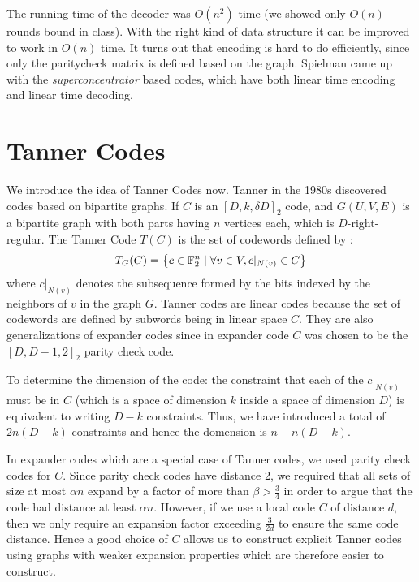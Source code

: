\begin{curiousity}
The running time of the decoder was $O(n^2)$ time (we showed only $O(n)$ rounds bound in class). With the right kind of data structure it can be improved to work in $O(n)$ time. It turns out that encoding is hard to do efficiently, since only the paritycheck matrix is defined based on the graph. Spielman came up with the
\textit{superconcentrator} based codes, which have both linear time encoding and linear time decoding.
\end{curiousity}

\section{Tanner Codes}

We introduce the idea of Tanner Codes now. Tanner in the 1980s discovered codes based on bipartite graphs. If $C$ is an $[D,k,\delta D]_2$ code, and $G(U,V,E)$ is a bipartite graph with both parts having $n$ vertices each, which is $D$-right-regular. The Tanner Code $T(C)$ is the set of codewords defined by :
$$T_G(C) = \left\{ c \in {\mathbb{F}}_2^n \mid  \forall v \in V, c|_{N(v)} \in C \right\}$$
where $c|_{N(v)}$ denotes the subsequence formed by the bits indexed by the neighbors of $v$ in the graph $G$. Tanner codes are linear codes because the set of codewords are defined by subwords being in linear space $C$. They are also generalizations of expander codes since in expander code $C$ was chosen to be the $[D,D-1,2]_2$ parity check code.

To determine the dimension of the code: the constraint that each of the $c|_{N(v)}$ must be in $C$ (which is a space of dimension $k$ inside a space of dimension $D$) is equivalent to writing $D-k$ constraints. Thus, we have introduced a total of $2n(D-k)$ constraints and hence the domension is $n-n(D-k)$. 

In expander codes which are a special case of Tanner codes, we used parity check codes for $C$. Since parity check codes have distance 2, we required that all sets of size at most $\alpha n$ expand by a factor of more than $\beta > \frac{3}{4}$ in order to argue that the code
had distance at least $\alpha n$. However, if we use a local code $C$ of distance $d$, then we only require an expansion factor exceeding $\frac{3}{2d}$ to ensure the same code distance. Hence a good choice of $C$ allows us to construct explicit Tanner codes using graphs with weaker expansion properties which are therefore easier to construct.

